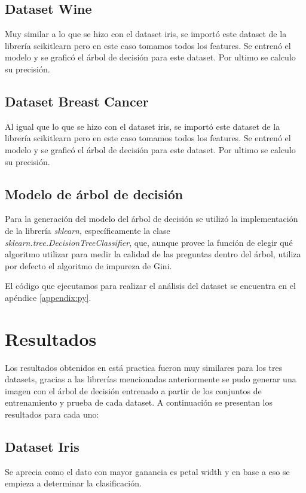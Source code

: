 \documentclass[sigconf,authorversion,nonacm]{acmart}
\begin{document}
\subsection{Dataset Wine}
Muy similar a lo que se hizo con el dataset iris, se importó este dataset de la librería scikitlearn pero en este caso tomamos todos los features.
Se entrenó el modelo y se graficó el árbol de decisión para este dataset.
Por ultimo se calculo su precisión.


\subsection{Dataset Breast Cancer}
Al igual que lo que se hizo con el dataset iris, se importó este dataset de la librería scikitlearn pero en este caso tomamos todos los features.
Se entrenó el modelo y se graficó el árbol de decisión para este dataset.
Por ultimo se calculo su precisión.


\subsection{Modelo de árbol de decisión}
Para la generación del modelo del árbol de decisión se utilizó la implementación de la librería \textit{sklearn}, específicamente la clase \\\textit{sklearn.tree.DecisionTreeClassifier}\cite{scikit-learn}, que, aunque provee la función de elegir qué algoritmo utilizar para medir la calidad de las preguntas dentro del árbol, utiliza por defecto el algoritmo de impureza de Gini.

El código que ejecutamos para realizar el análisis del dataset se encuentra en el apéndice \ref{appendix:py}.


\section{Resultados}
Los resultados obtenidos en está practica fueron muy similares para los tres datasets, gracias a las librerías mencionadas anteriormente se pudo generar una imagen con el árbol de decisión entrenado a partir de los conjuntos de entrenamiento y prueba de cada dataset.
A continuación se presentan los resultados para cada uno:


\subsection{Dataset Iris}
Se aprecia como el dato con mayor ganancia es petal width y en base a eso se empieza a determinar la clasificación.
\end{document}
